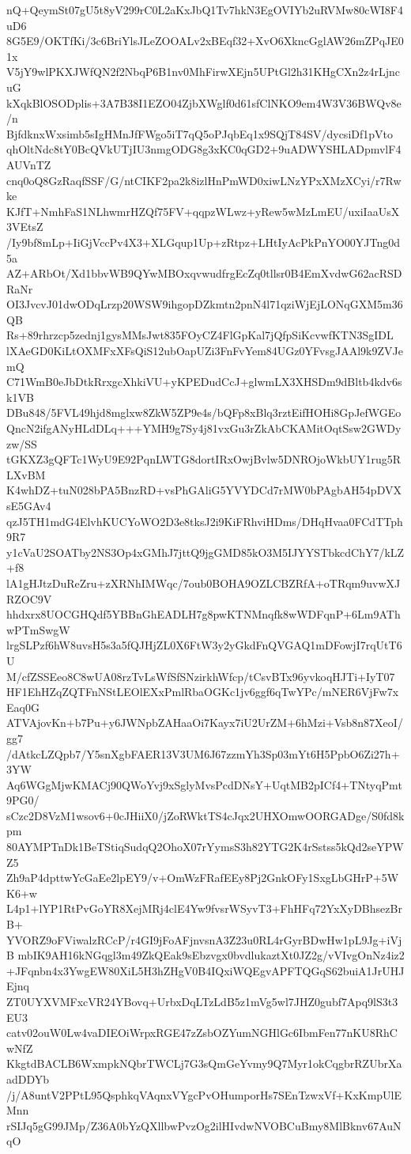 nQ+QeymSt07gU5t8yV299rC0L2aKxJbQ1Tv7hkN3EgOVIYb2uRVMw80cWI8F4uD6
8G5E9/OKTfKi/3c6BriYlsJLeZOOALv2xBEqf32+XvO6XkncGglAW26mZPqJE01x
V5jY9wlPKXJWfQN2f2NbqP6B1nv0MhFirwXEjn5UPtGl2h31KHgCXn2z4rLjncuG
kXqkBlOSODplis+3A7B38I1EZO04ZjbXWglf0d61sfClNKO9em4W3V36BWQv8e/n
BjfdknxWxsimb5sIgHMnJfFWgo5iT7qQ5oPJqbEq1x9SQjT84SV/dycsiDf1pVto
qhOltNdc8tY0BcQVkUTjIU3nmgODG8g3xKC0qGD2+9uADWYSHLADpmvlF4AUVnTZ
cnq0oQ8GzRaqfSSF/G/ntCIKF2pa2k8izlHnPmWD0xiwLNzYPxXMzXCyi/r7Rwke
KJfT+NmhFaS1NLhwmrHZQf75FV+qqpzWLwz+yRew5wMzLmEU/uxiIaaUsX3VEtsZ
/Iy9bf8mLp+IiGjVccPv4X3+XLGqup1Up+zRtpz+LHtIyAcPkPnYO00YJTng0d5a
AZ+ARbOt/Xd1bbvWB9QYwMBOxqvwudfrgEcZq0tllsr0B4EmXvdwG62acRSDRaNr
OI3JvcvJ01dwODqLrzp20WSW9ihgopDZkmtn2pnN4l71qziWjEjLONqGXM5m36QB
Rs+89rhrzcp5zednj1gysMMsJwt835FOyCZ4FlGpKal7jQfpSiKcvwfKTN3SgIDL
lXAeGD0KiLtOXMFxXFsQiS12ubOapUZi3FnFvYem84UGz0YFvsgJAAl9k9ZVJemQ
C71WmB0eJbDtkRrxgcXhkiVU+yKPEDudCcJ+glwmLX3XHSDm9dBltb4kdv6sk1VB
DBu848/5FVL49hjd8mglxw8ZkW5ZP9e4s/bQFp8xBlq3rztEifHOHi8GpJefWGEo
QncN2ifgANyHLdDLq+++YMH9g7Sy4j81vxGu3rZkAbCKAMitOqtSsw2GWDyzw/SS
tGKXZ3gQFTc1WyU9E92PqnLWTG8dortIRxOwjBvlw5DNROjoWkbUY1rug5RLXvBM
K4whDZ+tuN028bPA5BnzRD+vsPhGAliG5YVYDCd7rMW0bPAgbAH54pDVXsE5GAv4
qzJ5TH1mdG4ElvhKUCYoWO2D3e8tksJ2i9KiFRhviHDms/DHqHvaa0FCdTTph9R7
y1cVaU2SOATby2NS3Op4xGMhJ7jttQ9jgGMD85kO3M5IJYYSTbkcdChY7/kLZ+f8
lA1gHJtzDuReZru+zXRNhIMWqc/7oub0BOHA9OZLCBZRfA+oTRqm9uvwXJRZOC9V
hhdxrx8UOCGHQdf5YBBnGhEADLH7g8pwKTNMnqfk8wWDFqnP+6Lm9AThwPTmSwgW
lrgSLPzf6hW8uvsH5s3a5fQJHjZL0X6FtW3y2yGkdFnQVGAQ1mDFowjI7rqUtT6U
M/cfZSSEeo8C8wUA08rzTvLsWfSfSNzirkhWfcp/tCsvBTx96yvkoqHJTi+IyT07
HF1EhHZqZQTFnNStLEOlEXxPmlRbaOGKc1jv6ggf6qTwYPc/mNER6VjFw7xEaq0G
ATVAjovKn+b7Pu+y6JWNpbZAHaaOi7Kayx7iU2UrZM+6hMzi+Vsb8n87XeoI/gg7
/dAtkcLZQpb7/Y5snXgbFAER13V3UM6J67zzmYh3Sp03mYt6H5PpbO6Zi27h+3YW
Aq6WGgMjwKMACj90QWoYvj9xSglyMvsPcdDNsY+UqtMB2pICf4+TNtyqPmt9PG0/
sCzc2D8VzM1wsov6+0cJHiiX0/jZoRWktTS4cJqx2UHXOmwOORGADge/S0fd8kpm
80AYMPTnDk1BeTStiqSudqQ2OhoX07rYymsS3h82YTG2K4rSstss5kQd2seYPWZ5
Zh9aP4dpttwYcGaEe2lpEY9/v+OmWzFRafEEy8Pj2GnkOFy1SxgLbGHrP+5WK6+w
L4p1+lYP1RtPvGoYR8XejMRj4clE4Yw9fvsrWSyvT3+FhHFq72YxXyDBhsezBrB+
YVORZ9oFViwalzRCcP/r4GI9jFoAFjnvsnA3Z23u0RL4rGyrBDwHw1pL9Jg+iVjB
mbIK9AH16kNGqgl3m49ZkQEak9sEbzvgx0bvdlukaztXt0JZ2g/vVIvgOnNz4iz2
+JFqnbn4x3YwgEW80XiL5H3hZHgV0B4IQxiWQEgvAPFTQGqS62buiA1JrUHJEjnq
ZT0UYXVMFxcVR24YBovq+UrbxDqLTzLdB5z1mVg5wl7JHZ0gubf7Apq9lS3t3EU3
catv02ouW0Lw4vaDIEOiWrpxRGE47zZsbOZYumNGHlGc6IbmFen77nKU8RhCwNfZ
KkgtdBACLB6WxmpkNQbrTWCLj7G3sQmGeYvmy9Q7Myr1okCqgbrRZUbrXaadDDYb
/j/A8untV2PPtL95QsphkqVAqnxVYgcPvOHumporHs7SEnTzwxVf+KxKmpUlEMnn
rSIJq5gG99JMp/Z36A0bYzQXllbwPvzOg2ilHIvdwNVOBCuBmy8MlBknv67AuNqO

